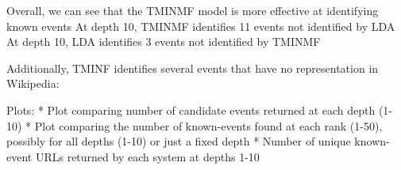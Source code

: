\documentclass{sig-alternate}
\begin{document}
Overall, we can see that the TMINMF model is more effective at identifying known events 
At depth 10, TMINMF identifies 11 events not identified by LDA
At depth 10, LDA identifies 3 events not identified by TMINMF

Additionally, TMINF identifies several events that have no representation in Wikipedia:


Plots:
* Plot comparing number of candidate events returned at each depth (1-10)
* Plot comparing the number of known-events found at each rank (1-50), possibly for all depths (1-10) or just a fixed depth
* Number of unique known-event URLs returned by each system at depths 1-10

\end{document}
